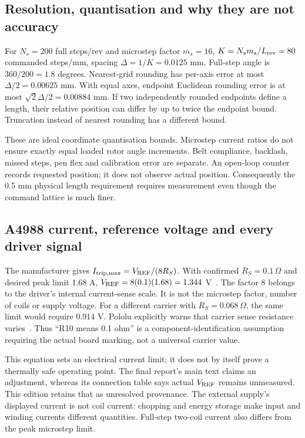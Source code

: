 \subsection{Resolution, quantisation and why they are not accuracy}
For $N_s=200$ full steps/rev and microstep factor $m_s=16$,
$K=N_sm_s/L_{\rm rev}=80$ commanded steps/mm, spacing
$\Delta=1/K=0.0125$ mm. Full-step angle is $360/200=1.8$ degrees.
Nearest-grid rounding has per-axis error at most $\Delta/2=0.00625$ mm.
With equal axes, endpoint Euclidean rounding error is at most
$\sqrt2\Delta/2=0.00884$ mm. If two independently rounded endpoints define
a length, their relative position can differ by up to twice the endpoint
bound. Truncation instead of nearest rounding has a different bound.

These are ideal coordinate quantisation bounds. Microstep current ratios do
not ensure exactly equal loaded rotor angle increments. Belt compliance,
backlash, missed steps, pen flex and calibration error are separate. An
open-loop counter records requested position; it does not observe actual
position. Consequently the 0.5 mm physical length requirement requires
measurement even though the command lattice is much finer.

\subsection{A4988 current, reference voltage and every driver signal}
The manufacturer gives $I_{\rm trip,max}=V_{\rm REF}/(8R_S)$.
With confirmed $R_S=0.1\,\Omega$ and desired peak limit 1.68 A,
$V_{\rm REF}=8(0.1)(1.68)=1.344$ V~\cite{a4988datasheet}.
The factor 8 belongs to the driver's internal current-sense scale. It is
not the microstep factor, number of coils or supply voltage. For a different
carrier with $R_S=0.068\,\Omega$, the same limit would require 0.914 V.
Pololu explicitly warns that carrier sense resistance varies~\cite{pololu4988}.
Thus ``R10 means 0.1 ohm'' is a component-identification assumption requiring
the actual board marking, not a universal carrier value.

This equation sets an electrical current limit; it does not by itself prove
a thermally safe operating point. The final report's main text claims an
adjustment, whereas its connection table says actual $V_{\rm REF}$ remains
unmeasured. This edition retains that as unresolved provenance. The external
supply's displayed current is not coil current: chopping and energy storage
make input and winding currents different quantities. Full-step two-coil
current also differs from the peak microstep limit.

